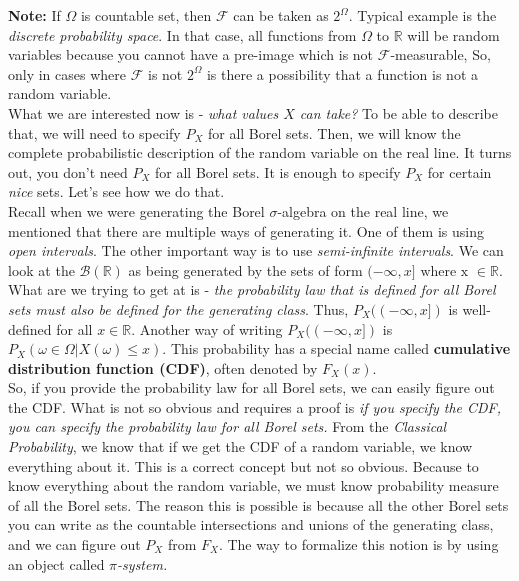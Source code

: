 \textbf{Note:} If $\Omega$ is countable set, then $\mathcal{F}$ can be taken as $2^\Omega$. Typical example is the \textit{discrete probability space}. In that case, all functions from $\Omega$ to $\mathbb{R}$ will be random variables because you cannot have a pre-image which is not $\mathcal{F}$-measurable, So, only in cases where $\mathcal{F}$ is not $2^\Omega$ is there a possibility that a function is not a random variable.\\

What we are interested now is - \textit{what values $X$ can take?} To be able to describe that, we will need to specify $P_X$ for all Borel sets. Then, we will know the complete probabilistic description of the random variable on the real line. It turns out, you don't need $P_X$ for all Borel sets. It is enough to specify $P_X$ for certain \textit{nice} sets. Let's see how we do that.\\

Recall when we were generating the Borel $\sigma$-algebra on the real line, we mentioned that there are multiple ways of generating it. One of them is using \textit{open intervals}. The other important way is to use \textit{semi-infinite intervals}. We can look at the $\mathcal{B}(\mathbb{R})$ as being generated by the sets of form $(-\infty, x] \text{ where x } \in \mathbb{R}$.\\

What are we trying to get at is - \textit{the probability law that is defined for all Borel sets must also be defined for the generating class}. Thus, $P_X((-\infty, x])$ is well-defined for all $x \in \mathbb{R}$. Another way of writing  $P_X((-\infty, x])$ is  $P_X({\omega \in \Omega | X(\omega) \leq x})$. This probability has a special name called \textbf{cumulative distribution function (CDF)}, often denoted by $F_X(x)$.\\

So, if you provide the probability law for all Borel sets, we can easily figure out the CDF. What is not so obvious and requires a proof is \textit{if you specify the CDF, you can specify the probability law for all Borel sets.} From the \textit{Classical Probability}, we know that if we get the CDF of a random variable, we know everything about it. This is a correct concept but not so obvious. Because to know everything about the random variable, we must know probability measure of all the Borel sets. The reason this is possible is because all the other Borel sets you can write as the countable intersections and unions of the generating class, and we can figure out $P_X$ from $F_X$. The way to formalize this notion is by using an object called \textit{$\pi$-system.}\\

